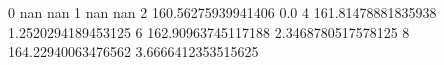 0 nan nan
1 nan nan
2 160.56275939941406 0.0
4 161.81478881835938 1.2520294189453125
6 162.90963745117188 2.3468780517578125
8 164.22940063476562 3.6666412353515625
